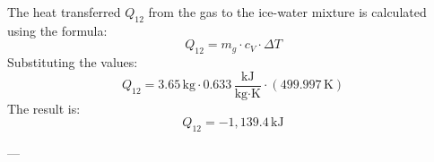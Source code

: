 The heat transferred \( Q_{12} \) from the gas to the ice-water mixture is calculated using the formula:  
\[
Q_{12} = m_g \cdot c_V \cdot \Delta T
\]  
Substituting the values:  
\[
Q_{12} = 3.65 \, \text{kg} \cdot 0.633 \, \frac{\text{kJ}}{\text{kg·K}} \cdot (499.997 \, \text{K})
\]  
The result is:  
\[
Q_{12} = -1,139.4 \, \text{kJ}
\]  

---
